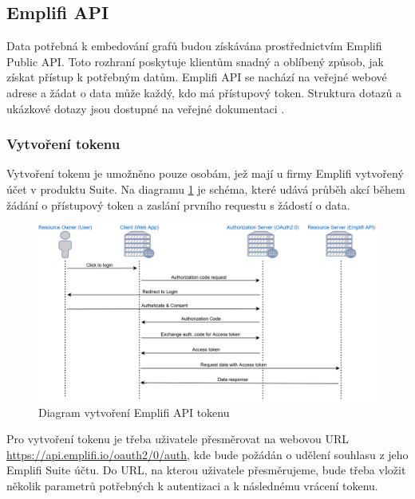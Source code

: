\documentclass[czech, bc, kiv, he, iso690numb]{fasthesis}
\begin{document}
\subsection{Emplifi API}	
Data potřebná k embedování grafů budou získávána prostřednictvím Emplifi Public API. 
Toto rozhraní poskytuje klientům snadný a oblíbený způsob, jak získat přístup k potřebným datům. 
Emplifi API se nachází na veřejné webové adrese a žádat o data může každý, kdo má přístupový token.
Struktura dotazů a ukázkové dotazy jsou dostupné na veřejné dokumentaci \cite{emplifiDocs}.

\subsubsection{Vytvoření tokenu}

Vytvoření tokenu je umožněno pouze osobám, jež mají u firmy Emplifi vytvořený účet v produktu Suite. Na diagramu \ref{fig:emplifAPIDiagram} je schéma, které udává průběh akcí během žádání o 
přístupový token a zaslání prvního requestu s žádostí o data.
\begin{figure}
	\centering
	\includegraphics[width=1\textwidth]{pictures/emplifiAPI.png}
	\caption{Diagram vytvoření Emplifi API tokenu \cite{emplifiDocs}}
	\label{fig:emplifAPIDiagram}
\end{figure}

Pro vytvoření tokenu je třeba uživatele přesměrovat na webovou URL \url{https://api.emplifi.io/oauth2/0/auth}, kde bude požádán o udělení souhlasu z jeho Emplifi Suite účtu.
Do URL, na kterou uživatele přesměrujeme, bude třeba vložit několik parametrů potřebných k autentizaci a k následnému vrácení tokenu. 
\end{document}
